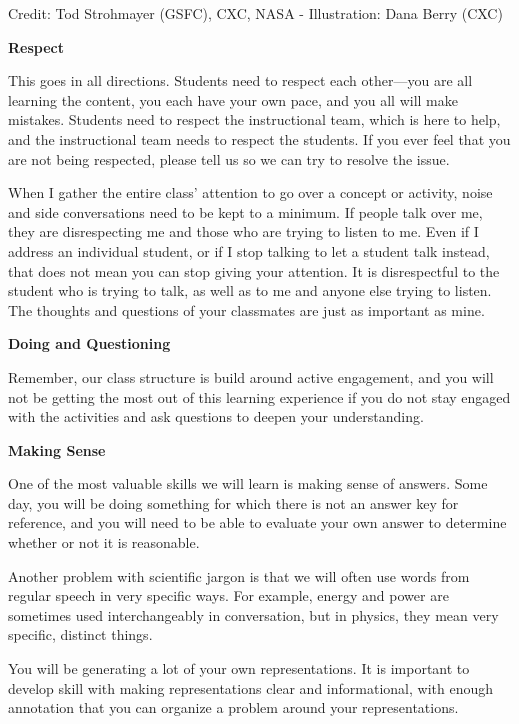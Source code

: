\documentclass[]{article}
\begin{document}
\begin{PresentSpace}
\begin{center}
	\small Credit: Tod Strohmayer (GSFC), CXC, NASA - Illustration: Dana Berry (CXC)
\end{center}
\end{PresentSpace}
\newpage
\begin{TeacherMargin}
\noindent\textbf{Respect}

This goes in all directions. Students need to respect each other---you are all learning the content, you each have your own pace, and you all will make mistakes. Students need to respect the instructional team, which is here to help, and the instructional team needs to respect the students. If you ever feel that you are not being respected, please tell us so we can try to resolve the issue.

When I gather the entire class' attention to go over a concept or activity, noise and side conversations need to be kept to a minimum. If people talk over me, they are disrespecting me and those who are trying to listen to me. Even if I address an individual student, or if I stop talking to let a student talk instead, that does not mean you can stop giving your attention. It is disrespectful to the student who is trying to talk, as well as to me and anyone else trying to listen. The thoughts and questions of your classmates are just as important as mine.

\noindent\textbf{Doing and Questioning}

Remember, our class structure is build around active engagement, and you will not be getting the most out of this learning experience if you do not stay engaged with the activities and ask questions to deepen your understanding.

\noindent\textbf{Making Sense}

One of the most valuable skills we will learn is making sense of answers. Some day, you will be doing something for which there is not an answer key for reference, and you will need to be able to evaluate your own answer to determine whether or not it is reasonable.

Another problem with scientific jargon is that we will often use words from regular speech in very specific ways. For example, energy and power are sometimes used interchangeably in conversation, but in physics, they mean very specific, distinct things.

You will be generating a lot of your own representations. It is important to develop skill with making representations clear and informational, with enough annotation that you can organize a problem around your representations.
\end{TeacherMargin}
\end{document}
